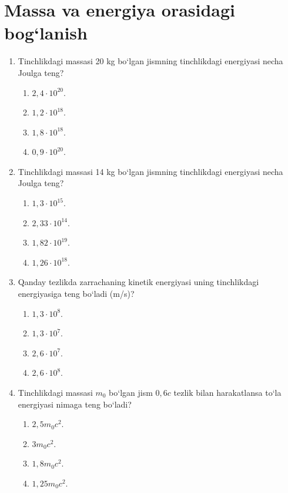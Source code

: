 \section{Massa va energiya orasidagi bog‘lanish}


\begin{enumerate}

\item Tinchlikdagi massasi 20 kg bo‘lgan jismning tinchlikdagi energiyasi necha Joulga teng?
\begin{enumerate}[label=\Alph*)]
\item $2,4\cdot 10^{20}$.
\item $1,2\cdot 10^{18}$.
\item $1,8\cdot 10^{18}$.
\item $0,9\cdot 10^{20}$.
\end{enumerate}

\item Tinchlikdagi massasi 14 kg bo‘lgan jismning tinchlikdagi energiyasi necha Joulga teng?
\begin{enumerate}[label=\Alph*)]
\item $1,3\cdot 10^{15}$.
\item $2,33\cdot 10^{14}$.
\item $1,82\cdot 10^{19}$.
\item $1,26\cdot 10^{18}$.
\end{enumerate}


\item Qanday tezlikda zarrachaning kinetik energiyasi uning tinchlikdagi energiyasiga teng bo‘ladi (m/s)?
\begin{enumerate}[label=\Alph*)]
\item $1,3\cdot 10^8$.
\item $1,3\cdot 10^7$.
\item $2,6\cdot 10^7$.
\item $2,6\cdot 10^8$.
\end{enumerate}

\item Tinchlikdagi massasi $m_0$ bo‘lgan jism $0,6c$ tezlik bilan harakatlansa to‘la energiyasi nimaga teng bo‘ladi?
\begin{enumerate}[label=\Alph*)]
\item $2,5m_0c^2$.
\item $3m_0c^2$.
\item $1,8m_0c^2$.
\item $1,25m_0c^2$.
\end{enumerate}


\end{enumerate}
